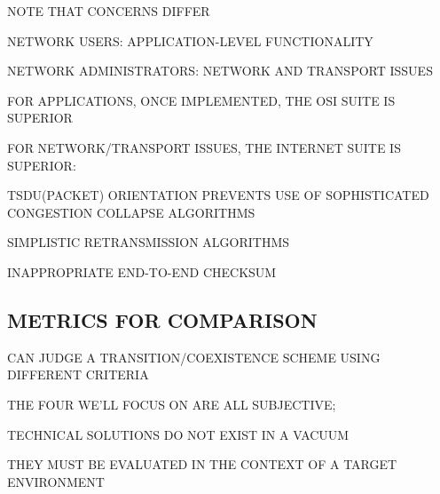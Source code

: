 

\begin{bwslide}

\begin{nrtc}
\item	NOTE THAT CONCERNS DIFFER
    \begin{nrtc}
    \item	NETWORK USERS: APPLICATION-LEVEL FUNCTIONALITY

    \item	NETWORK ADMINISTRATORS: NETWORK AND TRANSPORT ISSUES
    \end{nrtc}

\item	FOR APPLICATIONS, ONCE IMPLEMENTED, THE OSI SUITE IS SUPERIOR

\item	FOR NETWORK/TRANSPORT ISSUES, THE INTERNET SUITE IS SUPERIOR:
    \begin{nrtc}
    \item	TSDU(PACKET) ORIENTATION PREVENTS USE OF SOPHISTICATED
		CONGESTION COLLAPSE ALGORITHMS

    \item	SIMPLISTIC RETRANSMISSION ALGORITHMS

    \item	INAPPROPRIATE END-TO-END CHECKSUM
    \end{nrtc}
\end{nrtc}
\end{bwslide}


\begin{bwslide}
\part*	{METRICS FOR COMPARISON}\bf

\begin{nrtc}
\item	CAN JUDGE A TRANSITION/COEXISTENCE SCHEME USING DIFFERENT
	CRITERIA

\item	THE FOUR WE'LL FOCUS ON ARE ALL SUBJECTIVE;
    \begin{nrtc}
    \item	TECHNICAL SOLUTIONS DO NOT EXIST IN A VACUUM

    \item	THEY MUST BE EVALUATED IN THE CONTEXT OF A TARGET ENVIRONMENT
    \end{nrtc}
\end{nrtc}
\end{bwslide}


